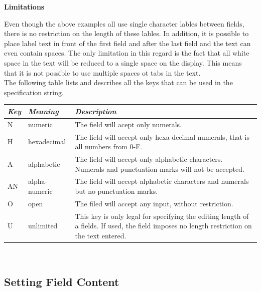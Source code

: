 \begin{center}
\end{center}

\textbf{Limitations}

Even though the above examples all use single character lables between
fields, there is no restriction on the length of these lables. In
addition, it is possible to place label text in front of the first field
and after the last field and the text can even contain spaces. The only
limitation in this regard is the fact that all white space in the text
will be reduced to a single space on the display. This means that it is
not possible to use multiple spaces ot tabs in the text.\\

The following table lists and describes all the keys that can be used in
the specification string.\\

\begin{center}
\begin{tabular}{|l|l|l|}
\hline \textit{Key} & \textit{Meaning} & \textit{Description} \\
\hline N & numeric & The field will acept only numerals.\\
\hline H & hexadecimal & The field will accept only hexa-decimal numerals, that is all numbers from 0-F.\\
\hline A & alphabetic & The field will accept only alphabetic characters. Numerals and punctuation marks will not be accepted.\\
\hline AN & alpha-numeric & The field will accept alphabetic characters and numerals but no punctuation marks.\\
\hline O & open & The filed will accept any input, without restriction.\\
\hline U & unlimited & This key is only legal for specifying the editing length of a fields. If used, the field imposes no length restriction on the text entered.\\
\end{tabular}\
\end{center}

\subsection{Setting Field Content}

